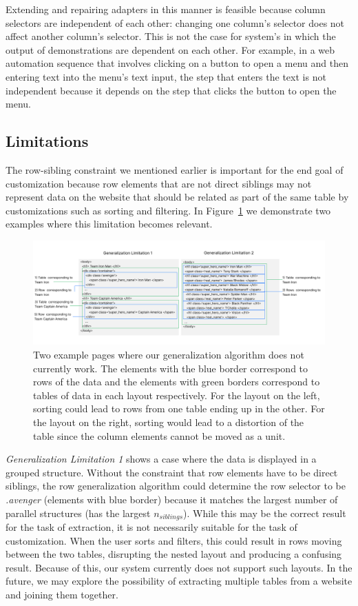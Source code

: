 \documentclass[sigconf,10pt]{acmart}
\begin{document}
Extending and repairing adapters in this manner is feasible because
column selectors are independent of each other: changing one column's
selector does not affect another column's selector. This is not the case
for system's in which the output of demonstrations are dependent on each
other. For example, in a web automation sequence that involves clicking
on a button to open a menu and then entering text into the menu's text
input, the step that enters the text is not independent because it
depends on the step that clicks the button to open the menu.

\hypertarget{limitations}{%
\subsection{Limitations}\label{limitations}}

The row-sibling constraint we mentioned earlier is important for the end
goal of customization because row elements that are not direct siblings
may not represent data on the website that should be related as part of
the same table by customizations such as sorting and filtering. In
Figure~\ref{fig:limitations} we demonstrate two examples where this
limitation becomes relevant.

\begin{figure}
  \includegraphics[width=\textwidth]{media/limitations.png}
  \caption{\label{fig:limitations} Two example pages where our generalization algorithm does not currently work. The elements with the blue border correspond to rows of the data and the elements with green borders correspond to tables of data in each layout respectively. For the layout on the left, sorting could lead to rows from one table ending up in the other. For the layout on the right, sorting would lead to a distortion of the table since the column elements cannot be moved as a unit.}
\end{figure}

\emph{Generalization Limitation 1} shows a case where the data is
displayed in a grouped structure. Without the constraint that row
elements have to be direct siblings, the row generalization algorithm
could determine the row selector to be \emph{.avenger} (elements with
blue border) because it matches the largest number of parallel
structures (has the largest \(n_{siblings}\)). While this may be the
correct result for the task of extraction, it is not necessarily
suitable for the task of customization. When the user sorts and filters,
this could result in rows moving between the two tables, disrupting the
nested layout and producing a confusing result. Because of this, our
system currently does not support such layouts. In the future, we may
explore the possibility of extracting multiple tables from a website and
joining them together.
\end{document}
